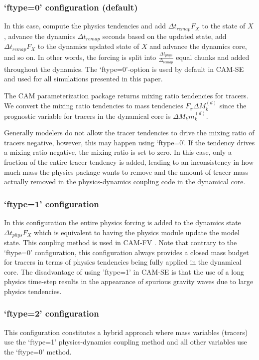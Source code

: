 \documentclass{agujournal}
\begin{document}
{\subsubsection{`ftype=0' configuration (default)}
In this case, compute the physics tendencies and add $\Delta t_{remap}F_X$ to the state of $X$, advance the dynamics $\Delta t_{remap}$ seconds based on the updated state, add $\Delta t_{remap}F_X$ to the dynamics updated state of $X$ and advance the dynamics core, and so on. In other words, the forcing is split into $\frac{\Delta t_{phys}}{\Delta_{remap}}$ equal chunks and added throughout the dynamics. The `ftype=0'-option is used by default in CAM-SE and used for all simulations presented in this paper.

The CAM parameterization package returns mixing ratio tendencies for tracers. We convert the mixing ratio tendencies to mass tendencies $F_x \Delta M^{(d)}_k$ since the prognostic variable for tracers in the dynamical core is $\Delta M_k m^{(d)}_k$.

Generally modelers do not allow the tracer tendencies to drive the mixing ratio of tracers negative, however, this may happen using `ftype=0'. If the tendency drives a mixing ratio negative, the mixing ratio is set to zero. In this case, only a fraction of the entire tracer tendency is added, leading to an inconsistency in how much mass the physics package wants to remove and the amount of tracer mass actually removed in the physics-dynamics coupling code in the dynamical core.
\subsubsection{`ftype=1' configuration}
In this configuration the entire physics forcing is added to the
dynamics state $\Delta t_{phys}F_X$ which is equivalent to having the
physics module update the model state. This coupling method is used in
CAM-FV \citep{L2004MWR}. Note that contrary to the `ftype=0'
configuration, this configuration always provides a closed mass budget
for tracers in terms of physics tendencies being fully applied in the
dynamical core. The disadvantage of using 'ftype=1' in CAM-SE is that
the use of a long physics time-step results in the appearance of
spurious gravity waves due to large physics tendencies.
\subsubsection{`ftype=2' configuration}
This configuration constitutes a hybrid approach where mass variables (tracers) use the `ftype=1' physics-dynamics coupling method and all other variables use the `ftype=0' method.


}
\end{document}
